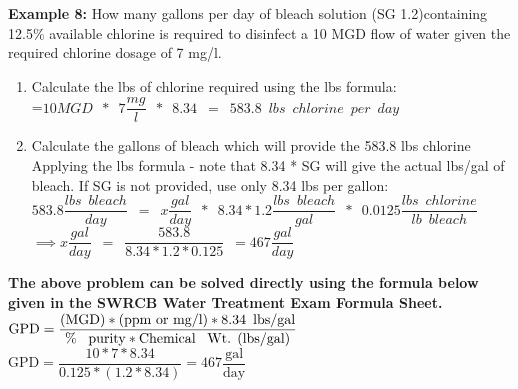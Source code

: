 \textbf{Example 8:} How many gallons per day of bleach solution (SG 1.2)containing 12.5\% available chlorine is required to disinfect a 10 MGD flow of water given the required chlorine dosage of 7 mg/l.\\
\begin{enumerate}
\item Calculate the lbs of chlorine required using the lbs formula:\\
\vspace{0.5cm}
=$10 MGD \enspace * \enspace 7 \dfrac{mg}{l} \enspace * \enspace 8.34\enspace=\enspace 583.8 \enspace lbs \enspace chlorine \enspace per \enspace day$\\
\vspace{0.5cm}
\item Calculate the gallons of bleach which will provide the 583.8 lbs chlorine\\
\vspace{0.5cm}
Applying the lbs formula - note that 8.34 * SG will give the actual lbs/gal of bleach.  If SG is not provided, use only 8.34 lbs per gallon:\\
\vspace{0.5cm}
$583.8 \dfrac{lbs \enspace bleach}{day}\enspace=\enspace x \dfrac{gal}{day} \enspace * \enspace 8.34 * 1.2 \dfrac{lbs \enspace bleach}{gal} \enspace * \enspace 0.0125 \dfrac{lbs \enspace chlorine}{lb \enspace bleach} \enspace $\\
\vspace{0.5cm}
$ \implies x \dfrac{gal}{day}\enspace = \enspace \dfrac{583.8}{8.34*1.2*0.125} \enspace = \boxed{467 \dfrac{gal}{day}}$
\end{enumerate}
\vspace{0.3cm}
\textbf{The above problem can be solved directly using the formula below given in the SWRCB Water Treatment Exam Formula Sheet.}\\
\vspace{0.3cm}
 $\textrm{GPD}=\dfrac{\textrm{(MGD)}*\textrm{(ppm or mg/l)}*8.34 \enspace \textrm{lbs/gal}}{\textrm{\% \enspace purity}*\textrm{Chemical \enspace Wt. (lbs/gal)}}$ 
 \vspace{0.3cm}
 $\textrm{GPD}=\dfrac{10*7*8.34}{0.125*(1.2*8.34)}=\boxed{467 \dfrac{\textrm{gal}}{\textrm{day}}}$ 

